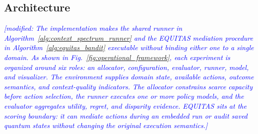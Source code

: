 \documentclass[conference]{IEEEtran}
\newcommand{\modified}[1]{\textcolor{blue}{{\it [modified: #1]}}}
\begin{document}
\subsection{Architecture}
\modified{The implementation makes the shared runner in
Algorithm~\ref{alg:context_spectrum_runner} and the EQUITAS mediation
procedure in Algorithm~\ref{alg:equitas_bandit} executable without binding
either one to a single domain. As shown in
Fig.~\ref{fig:operational_framework}, each experiment is organized around six
roles: an allocator, configuration, evaluator, runner, model, and visualizer.
The environment supplies domain state, available actions, outcome semantics,
and context-quality indicators. The allocator constrains scarce capacity before
action selection, the runner executes one or more policy models, and the
evaluator aggregates utility, regret, and disparity evidence. EQUITAS sits at
the scoring boundary: it can mediate actions during an embedded run or audit
saved quantum states without changing the original execution semantics.}
\end{document}
